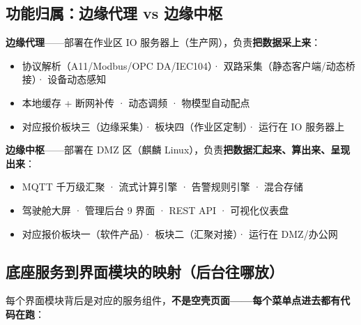 \documentclass[11pt,a4paper]{ctexart}
\begin{document}
\subsection{功能归属：边缘代理 vs 边缘中枢}

\noindent
\textbf{边缘代理}——部署在作业区 IO 服务器上（生产网），负责\textbf{把数据采上来}：
\begin{itemize}[leftmargin=*]
  \item 协议解析（A11/Modbus/OPC DA/IEC104）· 双路采集（静态客户端/动态桥接）· 设备动态感知
  \item 本地缓存 + 断网补传 · 动态调频 · 物模型自动配点
  \item 对应报价板块三（边缘采集）· 板块四（作业区定制）· 运行在 IO 服务器上
\end{itemize}

\noindent
\textbf{边缘中枢}——部署在 DMZ 区（麒麟 Linux），负责\textbf{把数据汇起来、算出来、呈现出来}：
\begin{itemize}[leftmargin=*]
  \item MQTT 千万级汇聚 · 流式计算引擎 · 告警规则引擎 · 混合存储
  \item 驾驶舱大屏 · 管理后台 9 界面 · REST API · 可视化仪表盘
  \item 对应报价板块一（软件产品）· 板块二（汇聚对接）· 运行在 DMZ/办公网
\end{itemize}

\subsection{底座服务到界面模块的映射（后台往哪放）}

每个界面模块背后是对应的服务组件，\textbf{不是空壳页面——每个菜单点进去都有代码在跑}：
\end{document}
